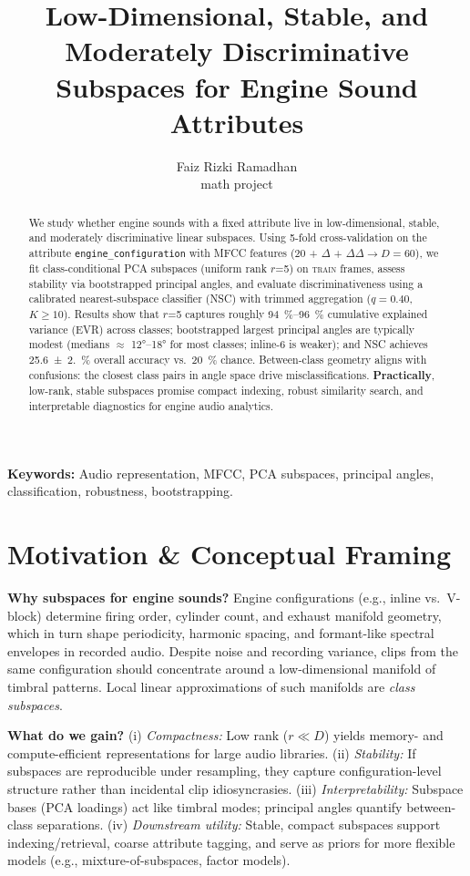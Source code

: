 \documentclass[11pt]{article}
\title{Low-Dimensional, Stable, and Moderately Discriminative Subspaces for Engine Sound Attributes}
\author{Faiz Rizki Ramadhan \\ \small math project}
\date{}
\newcommand{\D}{\ensuremath{D}\xspace}
\newcommand{\rankr}{\ensuremath{r}\xspace}
\newcommand{\EVR}{EVR\xspace}
\newcommand{\NSC}{NSC\xspace}
\begin{document}
\maketitle

\begin{abstract}
We study whether engine sounds with a fixed attribute live in low-dimensional, stable, and moderately discriminative linear subspaces. Using 5-fold cross-validation on the attribute \texttt{engine\_configuration} with MFCC features (20 + $\Delta$ + $\Delta\Delta \rightarrow \D=60$), we fit class-conditional PCA subspaces (uniform rank \rankr=5) on \textsc{train} frames, assess stability via bootstrapped principal angles, and evaluate discriminativeness using a calibrated nearest-subspace classifier (\NSC) with trimmed aggregation ($q=0.40$, $K\ge 10$). Results show that \rankr=5 captures roughly \SIrange{94}{96}{\percent} cumulative explained variance (\EVR) across classes; bootstrapped largest principal angles are typically modest (medians $\approx$ \ang{12}--\ang{18} for most classes; inline-6 is weaker); and \NSC achieves \SI{25.6(2.0)}{\percent} overall accuracy vs.\ \SI{20}{\percent} chance. Between-class geometry aligns with confusions: the closest class pairs in angle space drive misclassifications. \textbf{Practically}, low-rank, stable subspaces promise compact indexing, robust similarity search, and interpretable diagnostics for engine audio analytics.
\end{abstract}

\noindent\textbf{Keywords:} Audio representation, MFCC, PCA subspaces, principal angles, classification, robustness, bootstrapping.

\section{Motivation \& Conceptual Framing}

\textbf{Why subspaces for engine sounds?} Engine configurations (e.g., inline vs.\ V-block) determine firing order, cylinder count, and exhaust manifold geometry, which in turn shape periodicity, harmonic spacing, and formant-like spectral envelopes in recorded audio. Despite noise and recording variance, clips from the same configuration should concentrate around a low-dimensional manifold of timbral patterns. Local linear approximations of such manifolds are \emph{class subspaces}.

\textbf{What do we gain?} (i) \emph{Compactness:} Low rank (\rankr$\ll$\D) yields memory- and compute-efficient representations for large audio libraries. (ii) \emph{Stability:} If subspaces are reproducible under resampling, they capture configuration-level structure rather than incidental clip idiosyncrasies. (iii) \emph{Interpretability:} Subspace bases (PCA loadings) act like timbral modes; principal angles quantify between-class separations. (iv) \emph{Downstream utility:} Stable, compact subspaces support indexing/retrieval, coarse attribute tagging, and serve as priors for more flexible models (e.g., mixture-of-subspaces, factor models).
\end{document}
